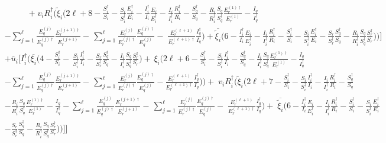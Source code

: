 \documentclass[a4paper]{article}
\newcommand{\dsum}{\displaystyle\sum}
\begin{document}
\begin{align}
+\; v_iR^\dagger_i\Big(\widetilde\xi_i\Big(2\ell+8 - \frac{S^\dagger _i}{S_i}-\frac{S_i}{S^\dagger _i}\frac{E^\dagger _i}{E_i}  - \frac{I^\dagger_i}{I_i}\frac{E_i}{E^\dagger_i}  - \frac{I_i}{I^\dagger_i}\frac{R^\dagger_i}{R_i} - \frac{S^\dagger _q}{S_q} - \frac{R_i}{R^\dagger _i}\frac{S_q}{S^\dagger _q}\frac{E^{(1)\dagger }_r}{E^{(1)}_r} -\frac{I_q}{I^\dagger _q}  \nonumber\end{align}\begin{align} &- {\dsum_{j=1}^{\ell}}\frac{E^{(j)}_q}{E^{(j)\dagger }_q}\frac{E^{(j+1)\dagger }_r}{E^{(j+1)}_r}-\, {\dsum_{j=1}^{\ell}}\frac{ E^{(j)}_r}{ E^{(j)\dagger }_r}\frac{E^{(j)\dagger }_q}{E^{(j)}_q}-\;\frac{E^{(\ell+1)}_r}{E^{(\ell+1)\dagger }_r}\frac{I^\dagger _q}{I_q}\Big)+ \overline{\widetilde\xi_i}\Big(6 - \frac{I^\dagger_i}{I_i} \frac{E_i}{E^\dagger_i} -\frac{I_i}{I^\dagger_i} \frac{R^\dagger_i}{R_i}-\frac{S^\dagger _i}{S_i}-\frac{S_i}{S^\dagger _i}\frac{E^\dagger _i}{E_i} -\frac{S_r}{S^\dagger _r}\frac{S^\dagger _q}{S_q}-\frac{R_i}{R^\dagger _i}\frac{S_q}{S^\dagger _q}\frac{S^\dagger _r}{S_r}\Big)\Big) \Big] \nonumber\\& + \bar u_i\Big[I^\dagger _i\Big(\overline{\xi_i} \Big(4  -\frac{S^\dagger _i}{S_i} - \,\frac{S_i}{S^\dagger_i} \frac{I^\dagger_i}{I_i} - \frac{S_r}{S^\dagger _r}\frac{S^\dagger _q}{S_q}-\frac{I_i}{I^\dagger _i} \frac{S_q}{S^\dagger _q}\frac{S^\dagger _r}{S_r}\Big) +\,\xi_i\Big(2\ell+6 - \frac{S^\dagger _i}{S_i}-\frac{S_i}{S^\dagger _i}\frac{I^\dagger_i}{I_i} -\frac{S^\dagger _q}{S_q} - \frac{I_i}{I^\dagger _i}\frac{S_q}{S^\dagger _q}\frac{E^{(1)\dagger }_r}{E^{(1)}_r}-\frac{I_q}{I^\dagger _q}\nonumber\\&- {\dsum_{j=1}^{\ell}}\frac{E^{(j)}_q}{E^{(j)\dagger }_q}\frac{E^{(j+1)\dagger }_r}{E^{(j+1)}_r}-\, {\dsum_{j=1}^{\ell}}\frac{ E^{(j)}_r}{ E^{(j)\dagger }_r}\frac{E^{(j)\dagger }_q}{E^{(j)}_q} -\frac{E^{(\ell+1)}_r}{E^{(\ell+1)\dagger }_r}\frac{I^\dagger _q}{I_q}  \Big) \Big) +\; v_iR^\dagger_i\Big(\widetilde\xi_i\Big(2\ell+7 - \frac{S^\dagger _i}{S_i}-\frac{S_i}{S^\dagger _i}\frac{I^\dagger_i}{I_i}  - \frac{I_i}{I^\dagger_i}\frac{R^\dagger_i}{R_i} - \frac{S^\dagger _q}{S_q} \nonumber\\&- \frac{R_i}{R^\dagger _i}\frac{S_q}{S^\dagger _q}\frac{E^{(1)\dagger }_r}{E^{(1)}_r}-\frac{I_q}{I^\dagger _q}- {\dsum_{j=1}^{\ell}}\frac{E^{(j)}_q}{E^{(j)\dagger }_q}\frac{E^{(j+1)\dagger }_r}{E^{(j+1)}_r}-\, {\dsum_{j=1}^{\ell}}\frac{ E^{(j)}_r}{ E^{(j)\dagger }_r}\frac{E^{(j)\dagger }_q}{E^{(j)}_q} -\;\frac{E^{(\ell+1)}_r}{E^{(\ell+1)\dagger }_r}\frac{I^\dagger _q}{I_q} \Big) +\; \overline{\widetilde\xi_i}\Big(6 - \frac{I^\dagger_i}{I_i} \frac{E_i}{E^\dagger_i} -\frac{I_i}{I^\dagger_i} \frac{R^\dagger_i}{R_i}-\frac{S^\dagger _i}{S_i}-\frac{S_i}{S^\dagger _i}\frac{E^\dagger _i}{E_i} \nonumber\\& -\frac{S_r}{S^\dagger _r}\frac{S^\dagger _q}{S_q}-\frac{R_i}{R^\dagger _i}\frac{S_q}{S^\dagger _q}\frac{S^\dagger _r}{S_r}\Big)\Big)\Big]\Bigg]

\end{align}
\end{document}
